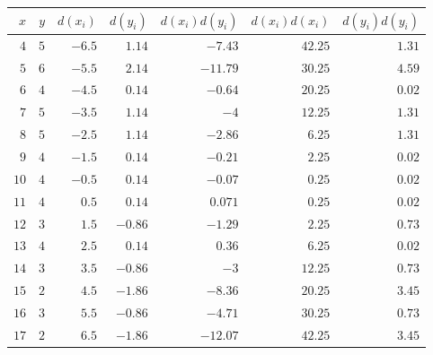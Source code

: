\begin{tabular}{rrrrrrr}                                                              \toprule
$x$  & $y$ & $d(x_i)$ & $d(y_i)$ & $d(x_i)d(y_i)$ & $d(x_i)d(x_i)$  & $d(y_i)d(y_i)$ \\\midrule
$4$  & $5$ & $-6.5$   & $1.14$   & $-7.43$       & $42.25$         & $1.31$         \\[4pt]
$5$  & $6$ & $-5.5$   & $2.14$   & $-11.79$      & $30.25$         & $4.59$         \\[4pt]
$6$  & $4$ & $-4.5$   & $0.14$   & $-0.64$       & $20.25$         & $0.02$         \\[4pt]
$7$  & $5$ & $-3.5$   & $1.14$   & $-4$          & $12.25$         & $1.31$         \\[4pt]
$8$  & $5$ & $-2.5$   & $1.14$   & $-2.86$       & $6.25$          & $1.31$         \\[4pt]
$9$  & $4$ & $-1.5$   & $0.14$   & $-0.21$       & $2.25$          & $0.02$         \\[4pt]
$10$ & $4$ & $-0.5$   & $0.14$   & $-0.07$       & $0.25$          & $0.02$         \\[4pt]
$11$ & $4$ & $0.5$    & $0.14$   & $0.071$       & $0.25$          & $0.02$         \\[4pt]
$12$ & $3$ & $1.5$    & $-0.86$  & $-1.29$       & $2.25$          & $0.73$         \\[4pt]
$13$ & $4$ & $2.5$    & $0.14$   & $0.36$        & $6.25$          & $0.02$         \\[4pt]
$14$ & $3$ & $3.5$    & $-0.86$  & $-3$          & $12.25$         & $0.73$         \\[4pt]
$15$ & $2$ & $4.5$    & $-1.86$  & $-8.36$       & $20.25$         & $3.45$         \\[4pt]
$16$ & $3$ & $5.5$    & $-0.86$  & $-4.71$       & $30.25$         & $0.73$         \\[4pt]
$17$ & $2$ & $6.5$    & $-1.86$  & $-12.07$      & $42.25$         & $3.45$         \\\bottomrule
\end{tabular}
